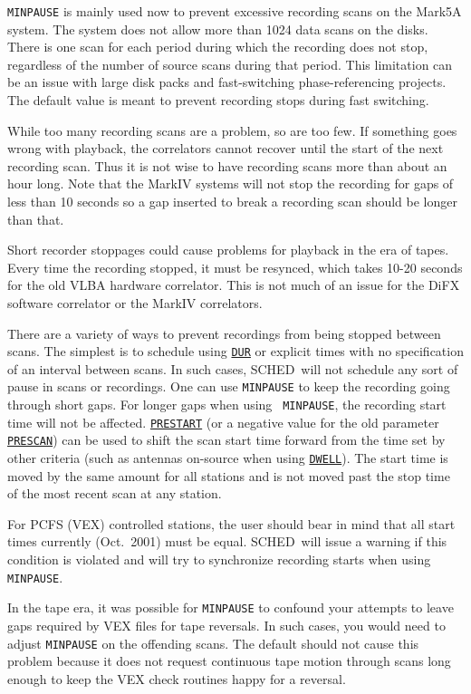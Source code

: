 \documentclass{report}
\newcommand{\schedb}{{\sc SCHED~}}
\begin{document}
{\tt MINPAUSE} is mainly used now to prevent excessive recording scans
on the Mark5A system.  The system does not allow more than 1024
data scans on the disks.  There is one scan for each period during which
the recording does not stop, regardless of the number of source scans
during that period.  This limitation can be an issue with large disk
packs and fast-switching phase-referencing projects.  The default
value is meant to prevent recording stops during fast switching.

While too many recording scans are a problem, so are too few.  If
something goes wrong with playback, the correlators cannot recover
until the start of the next recording scan.  Thus it is not wise to
have recording scans more than about an hour long.  Note that the MarkIV
systems will not stop the recording for gaps of less than 10 seconds
so a gap inserted to break a recording scan should be longer than
that.

Short recorder stoppages could cause problems for playback in the era
of tapes.  Every time the recording stopped, it must be resynced, which
takes 10-20 seconds for the old VLBA hardware correlator.  This is not
much of an issue for the DiFX software correlator or the MarkIV
correlators.

There are a variety of ways to prevent recordings from being stopped
between scans.  The simplest is to schedule using 
{\hyperref[MP:DUR]{{\tt DUR}}}
or explicit times with no specification of an interval
between scans.  In such cases, \schedb will not schedule any sort of
pause in scans or recordings.  One can use {\tt MINPAUSE} to keep the
recording going through short gaps.  For longer gaps when using {\tt
MINPAUSE}, the recording start time will not be affected.  
{\hyperref[MP:PRESTART]{{\tt PRESTART}}} (or a negative value for the old
parameter 
{\hyperref[MP:PRESCAN]{{\tt PRESCAN}}}) can be used to shift
the scan start time forward from the time set by other criteria (such
as antennas on-source when using 
{\hyperref[MP:DWELL]{{\tt DWELL}}}).
The start time is moved by the same amount for all stations and is not
moved past the stop time of the most recent scan at any station.

For PCFS (VEX) controlled stations, the user should bear in mind that
all start times currently (Oct.\ 2001) must be equal. \schedb will
issue a warning if this condition is violated and will try to
synchronize recording starts when using {\tt MINPAUSE}.

In the tape era, it was possible for {\tt MINPAUSE} to confound your
attempts to leave gaps required by VEX files for tape reversals.  In
such cases, you would need to adjust {\tt MINPAUSE} on the offending
scans.  The default should not cause this problem because it does not
request continuous tape motion through scans long enough to keep the
VEX check routines happy for a reversal.
\end{document}
